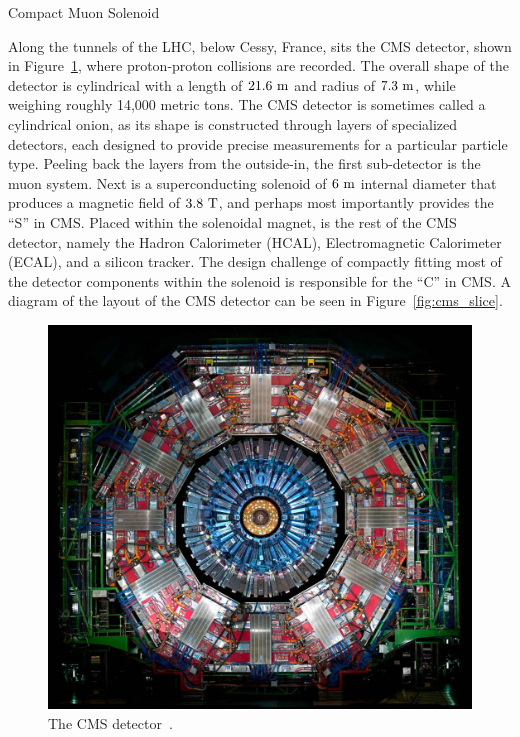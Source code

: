 \begin{section}{Compact Muon Solenoid}

Along the tunnels of the LHC, below Cessy, France, sits the CMS detector, shown in Figure~\ref{fig:cms_detector}, where proton-proton collisions are recorded.
The overall shape of the detector is cylindrical with a length of $21.6~\mathrm{m}$ and radius of $7.3~\mathrm{m}$, while weighing roughly 14,000 metric tons.
The CMS detector is sometimes called a cylindrical onion, as its shape is constructed through layers of specialized detectors, each designed to provide precise measurements for a particular particle type.
Peeling back the layers from the outside-in, the first sub-detector is the muon system. 
Next is a superconducting solenoid of $6~\mathrm{m}$ internal diameter that produces a magnetic field of $3.8~\mathrm{T}$, and perhaps most importantly provides the ``S'' in CMS.
Placed within the solenoidal magnet, is the rest of the CMS detector, namely the Hadron Calorimeter (HCAL), Electromagnetic Calorimeter (ECAL), and a silicon tracker.
The design challenge of compactly fitting most of the detector components within the solenoid is responsible for the ``C'' in CMS.
A diagram of the layout of the CMS detector can be seen in Figure~\ref{fig:cms_slice}.

\begin{figure}[tbp!]
\begin{center}
\includegraphics[angle=0,width=0.90\columnwidth]{fig/cms_detector.jpg}
\end{center}
\caption{The CMS detector~\cite{cms_detector}.}
\label{fig:cms_detector}
\end{figure}


\end{section}
